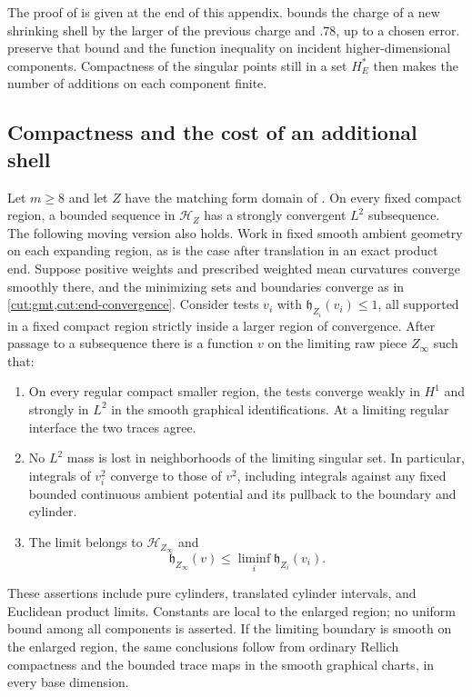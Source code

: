 The proof of  is given at the end of this appendix.
 bounds the charge of a new shrinking shell by
the larger of the previous charge and $.78$, up to a chosen error.
 preserve that bound and the function
inequality on incident higher-dimensional components. Compactness of the singular points still in a
set $H_E^*$ then makes the number of additions on each component finite.

\subsection{Compactness and the cost of an additional shell}

\begin{lemma}\label{enlargement:compactness}
Let $m\ge8$ and let $Z$ have the matching form domain of
. On every fixed compact region, a bounded
sequence in $\mathcal H_Z$ has a strongly convergent $L^2$ subsequence.  The following
moving version also holds.  Work in fixed smooth ambient geometry on each expanding region,
as is the case after translation in an exact product end.  Suppose
positive weights and prescribed weighted mean curvatures converge smoothly there, and the minimizing sets and boundaries converge as in \cref{cut:gmt,cut:end-convergence}.
Consider tests $v_i$ with $\mathfrak h_{Z_i}(v_i)\le1$, all
supported in a fixed compact region strictly inside a larger region of
convergence.  After passage to a subsequence there is a function $v$ on
the limiting raw piece $Z_\infty$ such that:
\begin{enumerate}[label=\textup{(\roman*)}]
\item On every regular compact smaller region, the tests converge weakly in
$H^1$ and strongly in $L^2$ in the smooth graphical identifications.  At
a limiting regular interface the two traces agree.
\item No $L^2$ mass is lost in neighborhoods of the limiting singular
set.  In particular, integrals of $v_i^2$ converge to those of $v^2$,
including integrals against any fixed bounded continuous ambient
potential and its pullback to the boundary and cylinder.
\item The limit belongs to $\mathcal H_{Z_\infty}$ and
\begin{equation}\label{enlargement:liminf}
 \mathfrak h_{Z_\infty}(v)
       \le\liminf_i\mathfrak h_{Z_i}(v_i).
\end{equation}
\end{enumerate}
These assertions include pure cylinders, translated cylinder intervals,
and Euclidean product limits.  Constants are local to the enlarged
region; no uniform bound among all components is asserted.
If the limiting boundary is smooth on the enlarged region, the same
conclusions follow from ordinary Rellich compactness and the bounded
trace maps in the smooth graphical charts, in every base dimension.
\end{lemma}


